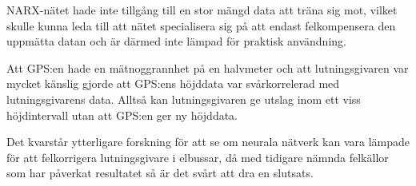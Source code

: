 {NARX-nätet hade inte tillgång till en stor mängd data att träna sig mot, vilket skulle kunna leda till att nätet specialisera sig på att endast felkompensera den uppmätta datan och är därmed inte lämpad för praktisk användning.

Att GPS:en hade en mätnoggrannhet på en halvmeter och att lutningsgivaren var mycket känslig gjorde att GPS:ens höjddata var svårkorrelerad med lutningsgivarens data. Alltså kan lutningsgivaren ge utslag inom ett viss höjdintervall utan att GPS:en ger ny höjddata. 

Det kvarstår ytterligare forskning för att se om neurala nätverk kan vara lämpade för att felkorrigera lutningsgivare i elbussar, då med tidigare nämnda felkällor som har påverkat resultatet så är det svårt att dra en slutsats.

}
